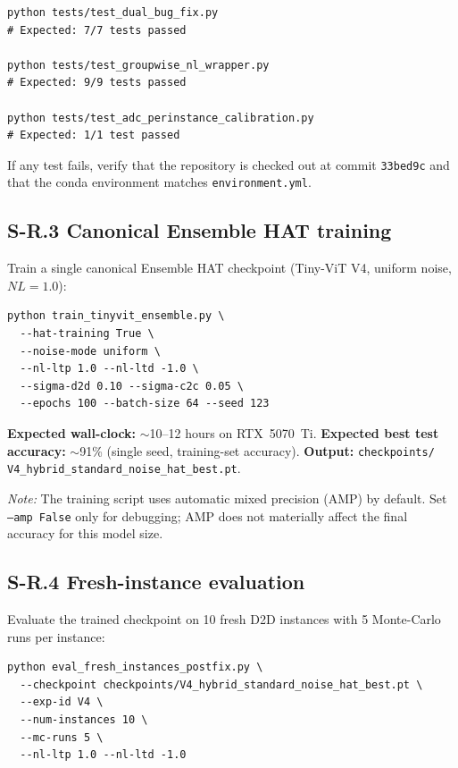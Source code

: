 \begin{verbatim}
python tests/test_dual_bug_fix.py
# Expected: 7/7 tests passed

python tests/test_groupwise_nl_wrapper.py
# Expected: 9/9 tests passed

python tests/test_adc_perinstance_calibration.py
# Expected: 1/1 test passed
\end{verbatim}

If any test fails, verify that the repository is checked out at commit \texttt{33bed9c} and that the conda environment matches \texttt{environment.yml}.

\subsection*{S-R.3 Canonical Ensemble HAT training}

Train a single canonical Ensemble HAT checkpoint (Tiny-ViT V4, uniform noise, $NL=1.0$):

\begin{verbatim}
python train_tinyvit_ensemble.py \
  --hat-training True \
  --noise-mode uniform \
  --nl-ltp 1.0 --nl-ltd -1.0 \
  --sigma-d2d 0.10 --sigma-c2c 0.05 \
  --epochs 100 --batch-size 64 --seed 123
\end{verbatim}

\textbf{Expected wall-clock:} $\sim$10--12 hours on RTX~5070~Ti.  
\textbf{Expected best test accuracy:} $\sim$91\% (single seed, training-set accuracy).  
\textbf{Output:} \texttt{checkpoints/}\\
\texttt{V4\_hybrid\_standard\_noise\_hat\_best.pt}.

\textit{Note:} The training script uses automatic mixed precision (AMP) by default. Set \texttt{--amp False} only for debugging; AMP does not materially affect the final accuracy for this model size.

\subsection*{S-R.4 Fresh-instance evaluation}

Evaluate the trained checkpoint on 10 fresh D2D instances with 5 Monte-Carlo runs per instance:

\begin{verbatim}
python eval_fresh_instances_postfix.py \
  --checkpoint checkpoints/V4_hybrid_standard_noise_hat_best.pt \
  --exp-id V4 \
  --num-instances 10 \
  --mc-runs 5 \
  --nl-ltp 1.0 --nl-ltd -1.0
\end{verbatim}

